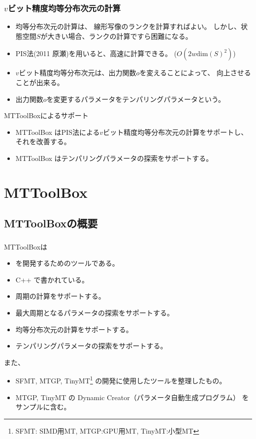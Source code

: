 \documentclass[cjk, dvips, handout, trans, xcolor=dvipsnames, hyperref={bookmarks=false}]{beamer}
\begin{document}
\begin{frame}[t]
  \frametitle{$v$ビット精度均等分布次元の計算}

  \begin{itemize}
  \item 均等分布次元の計算は、
  線形写像のランクを計算すればよい。
  しかし、状態空間$S$が大きい場合、ランクの計算ですら困難になる。
  \pause
  \item PIS法\cite{PIS}(2011 原瀬)を用いると、高速に計算できる。
    ($O(2w\mathrm{dim}(S)^2)$)
    \pause
  \item $v$ビット精度均等分布次元は、出力関数$o$を変えることによって、
    向上させることが出来る。
    \pause
  \item 出力関数$o$を変更するパラメータをテンパリングパラメータという。
  \end{itemize}

  \pause
  \begin{block}{MTToolBoxによるサポート}
    \begin{itemize}
    \item MTToolBox はPIS法による$v$ビット精度均等分布次元の計算をサポートし、
      それを改善する。
    \item MTToolBox はテンパリングパラメータの探索をサポートする。
    \end{itemize}
  \end{block}
\end{frame}

\section{MTToolBox}
\subsection{MTToolBoxの概要}
\begin{frame}[t]
  \frametitle{\insertsubsection}
  MTToolBoxは
  \begin{itemize}
  \item \FLPRNG を開発するためのツールである。
  \item C++ で書かれている。
  \item 周期の計算をサポートする。
  \item 最大周期となるパラメータの探索をサポートする。
  \item 均等分布次元の計算をサポートする。
  \item テンパリングパラメータの探索をサポートする。
  \end{itemize}

  \pause
  また、
  \begin{itemize}
  \item SFMT, MTGP, TinyMT\footnote{SFMT: SIMD用MT, MTGP:GPU用MT, TinyMT:小型MT}
    の開発に使用したツールを整理したもの。
  \item MTGP, TinyMT の Dynamic Creator（パラメータ自動生成プログラム）
    をサンプルに含む。
  \end{itemize}
\end{frame}
\end{document}

